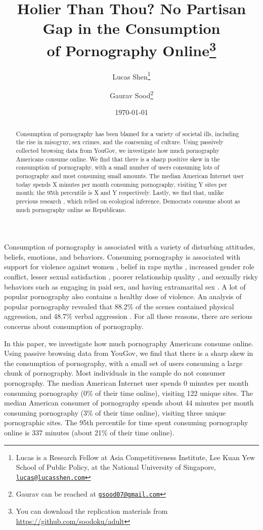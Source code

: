 \documentclass[12pt, letterpaper]{article}
\title{\Large{Holier Than Thou? No Partisan Gap in the Consumption\\ of Pornography Online}\footnote{You can download the replication materials from \href{http://github.com/soodoku/adult}{https://github.com/soodoku/adult}}}
\author{Lucas Shen\thanks{Lucas is a Research Fellow at Asia Competitiveness Institute, Lee Kuan Yew School of Public Policy, at the National University of Singapore, \href{mailto:lucas@lucasshen.com}{\footnotesize{\texttt{lucas@lucasshen.com}}}} \and Gaurav Sood\thanks{Gaurav can be reached at \href{mailto:gsood07@gmail.com}{\footnotesize{\texttt{gsood07@gmail.com}}}}\vspace{.5cm}}
\date{\today}
\begin{document}
\maketitle

\thispagestyle{empty}
\begin{abstract}
\noindent Consumption of pornography has been blamed for a variety of societal ills, including the rise in misogyny, sex crimes, and the coarsening of culture. Using passively collected browsing data from YouGov, we investigate how much pornography Americans consume online. We find that there is a sharp positive skew in the consumption of pornography, with a small number of users consuming lots of pornography and most consuming small amounts. The median American Internet user today spends X minutes per month consuming pornography, visiting Y sites per month; the 95th percentile is X and Y respectively. Lastly, we find that, unlike previous research \citep{macinnis2015american, edelman2009markets}, which relied on ecological inference, Democrats consume about as much pornography online as Republicans.
\end{abstract} 
\clearpage
\setcounter{page}{1}
\doublespace

Consumption of pornography is associated with a variety of disturbing attitudes, beliefs, emotions, and behaviors. Consuming pornography is associated with support for violence against women \citep{hald2010pornography, malamuth2012pornography, donnerstein1984pornography}, belief in rape myths \citep{foubert2011pornography}, increased gender role conflict, lesser sexual satisfaction \citep{szymanski2014psychological, stewart2012young}, poorer relationship quality \citep{szymanski2014psychological, szymanski2015male}, and sexually risky behaviors such as engaging in paid sex, and having extramarital sex \citep{wright2012internet}. A lot of popular pornography also contains a healthy dose of violence. An analysis of popular pornography revealed that 88.2\% of the scenes contained physical aggression, and 48.7\% verbal aggression \citep{bridges2010aggression}. For all these reasons, there are serious concerns about consumption of pornography.

In this paper, we investigate how much pornography Americans consume online. Using passive browsing data from YouGov, we find that there is a sharp skew in the consumption of pornography, with a small set of users consuming a large chunk of pornography. Most individuals in the sample do not consumer pornography.
The median American Internet user spends 0 minutes per month consuming pornography (0\% of their time online), visiting 122 unique sites. 
The median American consumer of pornography spends about 44 minutes per month consuming pornography (3\% of their time online), visiting three unique pornographic sites. 
The 95th percentile for time spent consuming pornography online is 337 minutes (about 21\% of their time online).
\end{document}
